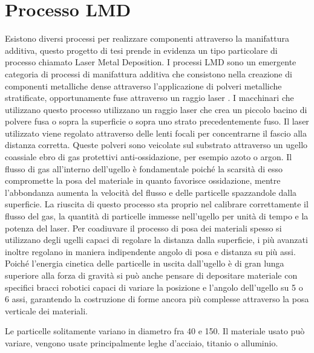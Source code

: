 \section{Processo LMD}
Esistono diversi processi per realizzare componenti attraverso la manifattura additiva,
questo progetto di tesi prende in evidenza un tipo particolare di processo chiamato Laser Metal Deposition.
I processi LMD sono un emergente categoria di processi di manifattura additiva che consistono nella creazione
di componenti metalliche dense attraverso l'applicazione di polveri metalliche stratificate, opportunamente fuse attraverso un raggio laser \cite{ZhangKai2014Coss}.
I macchinari che utilizzano questo processo utilizzano un raggio laser che crea un piccolo bacino di polvere fusa o sopra la superficie o sopra uno strato precedentemente fuso.
Il laser utilizzato viene regolato attraverso delle lenti focali per concentrarne il fascio alla distanza corretta.
Queste polveri sono veicolate sul substrato attraverso un ugello coassiale ebro di gas protettivi anti-ossidazione, per esempio azoto o argon.
Il flusso di gas all'interno dell'ugello è fondamentale poiché la scarsità di esso compromette la posa del materiale in quanto favorisce ossidazione, mentre l'abbondanza
aumenta la velocità del flusso e delle particelle spazzandole dalla superficie.
La riuscita di questo processo sta proprio nel calibrare correttamente il flusso del gas, la quantità di particelle immesse nell'ugello per unità di tempo e la potenza del laser.
Per coadiuvare il processo di posa dei materiali spesso si utilizzano degli ugelli capaci di regolare la distanza dalla superficie, i più avanzati inoltre regolano in maniera indipendente
angolo di posa e distanza su più assi. Poiché l'energia cinetica delle particelle in uscita dall'ugello è di gran lunga superiore alla forza di gravità si può anche pensare di depositare materiale 
con specifici bracci robotici capaci di variare la posizione e l'angolo dell'ugello su 5 o 6 assi, garantendo la costruzione di forme ancora più complesse attraverso la posa verticale dei materiali.

Le particelle solitamente variano in diametro fra 40\textmu{} e 150\textmu{}.
Il materiale usato può variare, vengono usate principalmente leghe d'acciaio, titanio o alluminio. 

